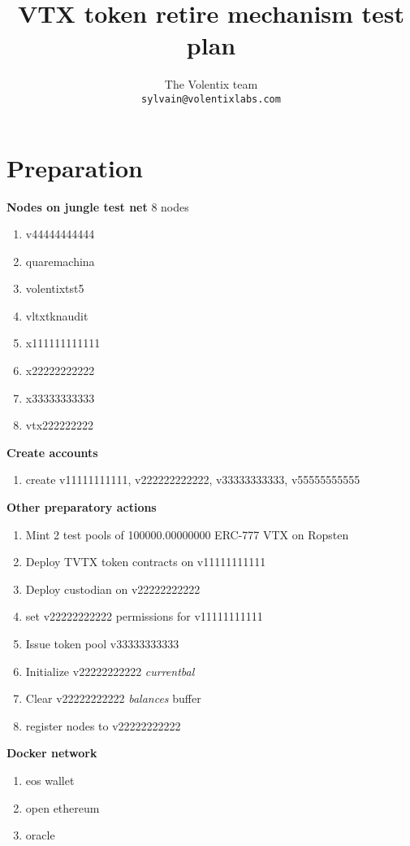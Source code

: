 \documentclass[]{article}
\title{VTX token retire mechanism test plan}
\author{
		The Volentix team\\
	\texttt{sylvain@volentixlabs.com}
}
\begin{document}
\maketitle


\section{Preparation}

\textbf{Nodes on jungle test net}
	8 nodes
	\begin{enumerate}
		\paragraph{}
		\item v44444444444 
		\item quaremachina
		\item volentixtst5
		\item vltxtknaudit
		\item x111111111111
		\item x22222222222
		\item  x33333333333
		\item  vtx222222222				
	  \end{enumerate}
\textbf{Create accounts}
\begin{enumerate}
\item create v11111111111, v222222222222, v33333333333, v55555555555
\end{enumerate} 
 \textbf{Other preparatory actions}
  		\begin{enumerate}
		  \item Mint 2 test pools of  100000.00000000 ERC-777 VTX on Ropsten
		  \item Deploy TVTX token contracts on v11111111111 
		  \item Deploy custodian on v22222222222
		  \item set v22222222222 permissions for v11111111111
		  \item Issue token pool v33333333333
		  \item Initialize v22222222222 \textit{currentbal}
		  \item Clear v22222222222 \textit{balances} buffer
		    \item register nodes to v22222222222\\
	 \end{enumerate}
   \textbf{Docker network}\\
  \begin{enumerate}
  	\item eos wallet
  	\item open ethereum
  	\item oracle
  \end{enumerate}
\end{document}
